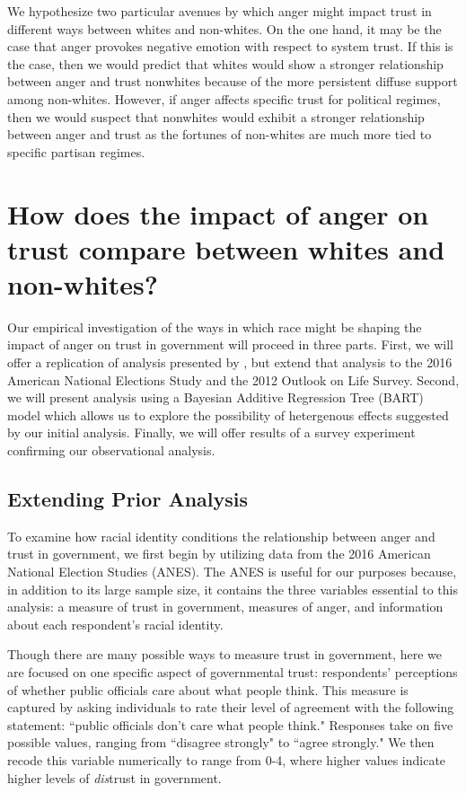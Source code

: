 \documentclass[12t, letterpaper]{article}
\begin{document}
We hypothesize two particular avenues by which anger might impact trust in different ways between whites and non-whites. On the one hand, it may be the case that anger provokes negative emotion with respect to system trust. If this is the case, then we would predict that whites would show a stronger relationship between anger and trust nonwhites because of the more persistent diffuse support among non-whites. However, if anger affects specific trust for political regimes, then we would suspect that nonwhites would exhibit a stronger relationship between anger and trust as the fortunes of non-whites are much more tied to specific partisan regimes.

\section{How does the impact of anger on trust compare between whites and non-whites?}
\label{sec:design}

Our empirical investigation of the ways in which race might be shaping the impact of anger on trust in government will proceed in three parts. First, we will offer a replication of analysis presented by \citet{webster2017}, but extend that analysis to the 2016 American National Elections Study and the 2012 Outlook on Life Survey. Second, we will present analysis using a  Bayesian Additive Regression Tree (BART) model which allows us to explore the possibility of hetergenous effects suggested by our initial analysis. Finally, we will offer results of a survey experiment confirming our observational analysis.

\subsection{Extending Prior Analysis}
\label{subsec:anes}

To examine how racial identity conditions the relationship between anger and trust in government, we first begin by utilizing data from the 2016 American National Election Studies (ANES). The ANES is useful for our purposes because, in addition to its large sample size, it contains the three variables essential to this analysis: a measure of trust in government, measures of anger, and information about each respondent's racial identity.

Though there are many possible ways to measure trust in government, here we are focused on one specific aspect of governmental trust: respondents' perceptions of whether public officials care about what people think. This measure is captured by asking individuals to rate their level of agreement with the following statement: ``public officials don't care what people think." Responses take on five possible values, ranging from ``disagree strongly" to ``agree strongly." We then recode this variable numerically to range from 0-4, where higher values indicate higher levels of \emph{dis}trust in government.
\end{document}
